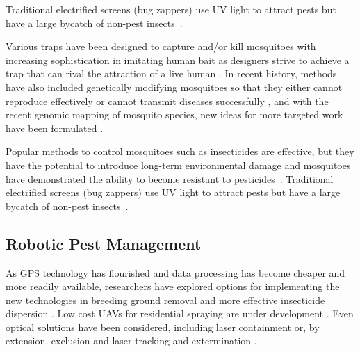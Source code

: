 \documentclass[letterpaper, 10 pt, conference]{ieeeconf}  %
\begin{document}
Traditional electrified screens (bug zappers) use UV light to attract pests but have a large bycatch of non-pest insects~\cite{University-Of-Florida1997}. 

	Various traps have been designed to capture and/or kill mosquitoes with increasing sophistication in imitating human bait as designers strive to achieve a trap that can rival the attraction of a live human \cite{maliti2015development}.  In recent history, methods have also included genetically modifying mosquitoes so that they either cannot reproduce effectively or cannot transmit diseases successfully \cite{marshall2009malaria}, and with the recent genomic mapping of mosquito species, new ideas for more targeted work have been formulated \cite{hill2005arthropod}.
	
	Popular methods to control mosquitoes such as insecticides are effective, but they have the potential to introduce long-term environmental damage and mosquitoes have demonstrated the ability to become resistant to pesticides~\cite{ndiath2012resistance}. Traditional electrified screens (bug zappers) use UV light to attract pests but have a large bycatch of non-pest insects~\cite{University-Of-Florida1997}. 
	
 
    \subsection{Robotic Pest Management}
    
As GPS technology has flourished and data processing has become cheaper and more readily available, researchers have explored options for implementing the new technologies in breeding ground removal \cite{anupa2014identification} and more effective insecticide dispersion \cite{hur2015low}.  Low cost UAVs for residential spraying are under development \cite{amenyo2014medizdroids}.  Even optical solutions have been considered, including laser containment \cite{boonsri2012laser} or, by extension, exclusion and laser tracking and extermination \cite{kare2010build}.
    
\end{document}
